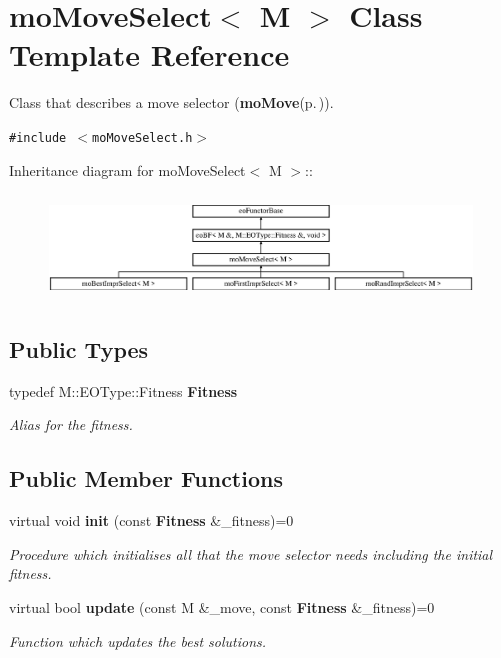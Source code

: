 \section{mo\-Move\-Select$<$ M $>$ Class Template Reference}
\label{classmo_move_select}
Class that describes a move selector ({\bf mo\-Move}{\rm (p.\,\pageref{classmo_move})}).  


{\tt \#include $<$mo\-Move\-Select.h$>$}

Inheritance diagram for mo\-Move\-Select$<$ M $>$::\begin{figure}[H]
\begin{center}
\leavevmode
\includegraphics[height=2.82828cm]{classmo_move_select}
\end{center}
\end{figure}
\subsection*{Public Types}
\begin{CompactItemize}
\item 
typedef M::EOType::Fitness {\bf Fitness}\label{classmo_move_select_w0}

\begin{CompactList}\small\item\em Alias for the fitness. \item\end{CompactList}\end{CompactItemize}
\subsection*{Public Member Functions}
\begin{CompactItemize}
\item 
virtual void {\bf init} (const {\bf Fitness} \&\_\-fitness)=0
\begin{CompactList}\small\item\em Procedure which initialises all that the move selector needs including the initial fitness. \item\end{CompactList}\item 
virtual bool {\bf update} (const M \&\_\-move, const {\bf Fitness} \&\_\-fitness)=0
\begin{CompactList}\small\item\em Function which updates the best solutions. \item\end{CompactList}\end{CompactItemize}


